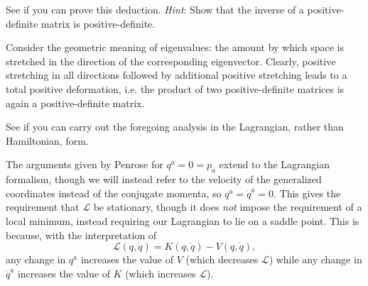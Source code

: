 \documentclass[../road-to-reality.tex]{subfiles}
\begin{document}
\begin{questions}
\question See if you can prove this deduction. \textit{Hint}: Show that the
  inverse of a positive-definite matrix is positive-definite.

  \begin{solution}
    Consider the geometric meaning of eigenvalues: the amount by which space is
    stretched in the direction of the corresponding eigenvector. Clearly,
    positive stretching in all directions followed by additional positive
    stretching leads to a total positive deformation, i.e. the product of two
    positive-definite matrices is again a positive-definite matrix.
  \end{solution}


\question See if you can carry out the foregoing analysis in the Lagrangian,
  rather than Hamiltonian, form.

  \begin{solution}
    The arguments given by Penrose for $q^a = 0 = p_a$ extend to the Lagrangian
    formalism, though we will instead refer to the velocity of the generalized
    coordinates instead of the conjugate momenta, so $q^a = \dot{q}^a = 0$. This
    gives the requirement that $\mathcal{L}$ be stationary, though it does
    \textit{not} impose the requirement of a local minimum, instead requiring
    our Lagrangian to lie on a saddle point. This is because,
    with the interpretation of
    \[
      \mathcal{L}(q, \dot{q}) = K(q, \dot{q}) - V(q, \dot{q}),
    \]
    any change in $q^a$ increases the value of $V$ (which decreases $\mathcal{L}$)
    while any change in $\dot{q}^a$ increases the value of $K$ (which increases
    $\mathcal{L}$).


\end{solution}
\end{questions}
\end{document}
